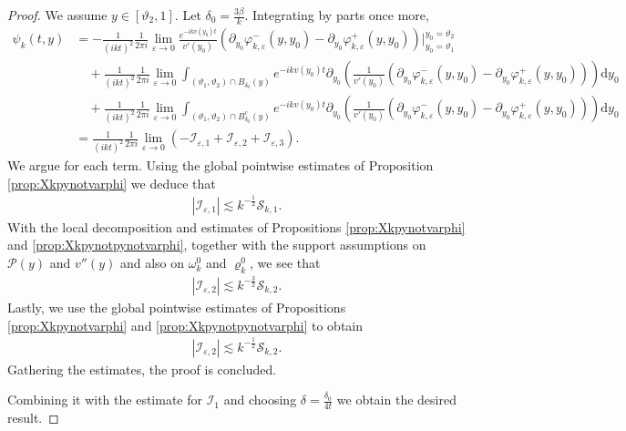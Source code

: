 \documentclass[11pt,reqno]{amsproc}
\theoremstyle{definition}
\numberwithin{equation}{section}
\newcommand{\cI}{{\mathcal I}}
\newcommand{\cS}{{\mathcal S}}
\renewcommand{\d}{\mathrm{d}}
\newcommand{\ep}{\varepsilon}
\renewcommand{\P}{{\mathcal{P}}}
\begin{document}
\begin{proof}
We assume $y\in [\vartheta_2, 1]$.  Let $\delta_0=\frac{3\beta}{k}$. Integrating by parts once more, 
\begin{align*}
\psi_k(t,y) &=  -\frac{1}{(ikt)^2}\frac{1}{2\pi i}\lim_{\ep\rightarrow 0} \frac{e^{-ikv(y_0)t}}{v'(y_0)} \left( \partial_{y_0}\varphi_{k,\ep}^-(y,y_0) - \partial_{y_0}\varphi_{k,\ep}^+(y,y_0) \right) \Big|_{y_0=\vartheta_1}^{y_0=\vartheta_2} \\
&\quad + \frac{1}{(ikt)^2}\frac{1}{2\pi i}\lim_{\ep\rightarrow 0} \int_{(\vartheta_1,\vartheta_2)\cap B_{\delta_0}(y)} {e^{-ikv(y_0)t}} \partial_{y_0} \left( \frac{1}{v'(y_0)} \left( \partial_{y_0}\varphi_{k,\ep}^-(y,y_0) - \partial_{y_0}\varphi_{k,\ep}^+(y,y_0) \right) \right) \d y_0 \\
&\quad + \frac{1}{(ikt)^2}\frac{1}{2\pi i}\lim_{\ep\rightarrow 0} \int_{(\vartheta_1,\vartheta_2)\cap B_{\delta_0}^c(y)} {e^{-ikv(y_0)t}} \partial_{y_0} \left( \frac{1}{v'(y_0)} \left( \partial_{y_0}\varphi_{k,\ep}^-(y,y_0) - \partial_{y_0}\varphi_{k,\ep}^+(y,y_0) \right) \right) \d y_0 \\
&= \frac{1}{(ikt)^2}\frac{1}{2\pi i}\lim_{\ep\rightarrow 0} \left( -\cI_{\ep,1} + \cI_{\ep,2} + \cI_{\ep,3} \right).
\end{align*}
We argue for each term. Using the global pointwise estimates of Proposition \ref{prop:Xkpynotvarphi} we deduce that
\begin{align*}
\left| \cI_{\ep,1} \right| \lesssim k^{-\frac12}\cS_{k,1}.
\end{align*} 
With the local decomposition and estimates of Propositions \ref{prop:Xkpynotvarphi} and \ref{prop:Xkpynotpynotvarphi}, together with the support assumptions on $\P(y)$ and $v''(y)$ and also on $\omega_k^0$ and $\varrho_k^0$, we see that
\begin{align*}
\left| \cI_{\ep,2} \right| \lesssim k^{-\frac32}\cS_{k,2}.
\end{align*}
Lastly, we use the global pointwise estimates of Propositions \ref{prop:Xkpynotvarphi} and \ref{prop:Xkpynotpynotvarphi} to obtain
\begin{align*}
\left| \cI_{\ep,2} \right| \lesssim k^{-\frac12}\cS_{k,2}.
\end{align*}
Gathering the estimates, the proof is concluded.

Combining it with the estimate for $\cI_1$ and choosing $\delta= \frac{\delta_0}{4t}$ we obtain the desired result.
\end{proof}
\end{document}
